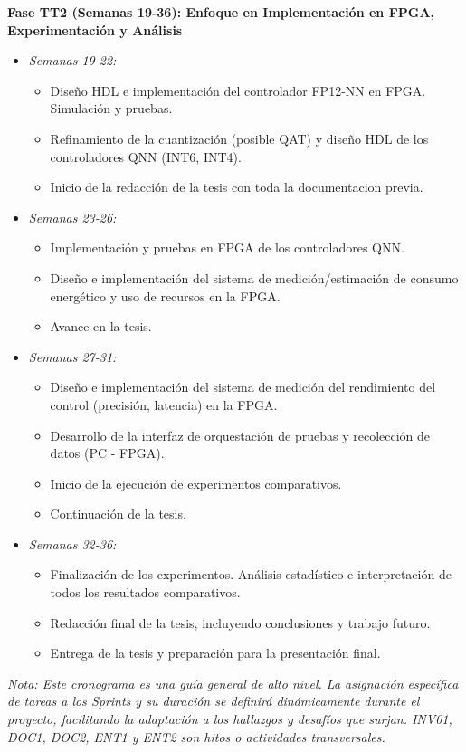 \documentclass[12pt]{article}
\begin{document}
\textbf{Fase TT2 (Semanas 19-36): Enfoque en Implementación en FPGA, Experimentación y Análisis}
\begin{itemize}
    \item \textit{Semanas 19-22:}
        \begin{itemize}
            \item [EP04] Diseño HDL e implementación del controlador FP12-NN en FPGA. Simulación y pruebas.
            \item [EP05/EP06] Refinamiento de la cuantización (posible QAT) y diseño HDL de los controladores QNN (INT6, INT4).
            \item [DOC2] Inicio de la redacción de la tesis con toda la documentacion previa.
        \end{itemize}
    \item \textit{Semanas 23-26:}
        \begin{itemize}
            \item [EP06] Implementación y pruebas en FPGA de los controladores QNN.
            \item [EP07] Diseño e implementación del sistema de medición/estimación de consumo energético y uso de recursos en la FPGA.
            \item [DOC2] Avance en la tesis.
        \end{itemize}
    \item \textit{Semanas 27-31:}
        \begin{itemize}
            \item [EP08] Diseño e implementación del sistema de medición del rendimiento del control (precisión, latencia) en la FPGA.
            \item [EP09] Desarrollo de la interfaz de orquestación de pruebas y recolección de datos (PC - FPGA).
            \item [EP10] Inicio de la ejecución de experimentos comparativos.
            \item [DOC2] Continuación de la tesis.
        \end{itemize}
    \item \textit{Semanas 32-36:}
        \begin{itemize}
            \item [EP10] Finalización de los experimentos. Análisis estadístico e interpretación de todos los resultados comparativos.
            \item [DOC2] Redacción final de la tesis, incluyendo conclusiones y trabajo futuro.
            \item [ENT2] Entrega de la tesis y preparación para la presentación final.
        \end{itemize}
\end{itemize}
\textit{Nota: Este cronograma es una guía general de alto nivel. La asignación específica de tareas a los \textit{Sprints} y su duración se definirá dinámicamente durante el proyecto, facilitando la adaptación a los hallazgos y desafíos que surjan. INV01, DOC1, DOC2, ENT1 y ENT2 son hitos o actividades transversales.}
\end{document}
